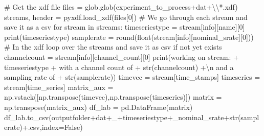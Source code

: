 \documentclass[
  letterpaper,
  DIV=11,
  numbers=noendperiod]{scrreprt}
\newenvironment{Shaded}{\begin{snugshade}}{\end{snugshade}}
\newcommand{\BuiltInTok}[1]{\textcolor[rgb]{0.00,0.23,0.31}{#1}}
\newcommand{\CharTok}[1]{\textcolor[rgb]{0.13,0.47,0.30}{#1}}
\newcommand{\CommentTok}[1]{\textcolor[rgb]{0.37,0.37,0.37}{#1}}
\newcommand{\ControlFlowTok}[1]{\textcolor[rgb]{0.00,0.23,0.31}{#1}}
\newcommand{\DecValTok}[1]{\textcolor[rgb]{0.68,0.00,0.00}{#1}}
\newcommand{\KeywordTok}[1]{\textcolor[rgb]{0.00,0.23,0.31}{#1}}
\newcommand{\NormalTok}[1]{\textcolor[rgb]{0.00,0.23,0.31}{#1}}
\newcommand{\OperatorTok}[1]{\textcolor[rgb]{0.37,0.37,0.37}{#1}}
\newcommand{\StringTok}[1]{\textcolor[rgb]{0.13,0.47,0.30}{#1}}
\newcommand{\VariableTok}[1]{\textcolor[rgb]{0.07,0.07,0.07}{#1}}
\begin{document}
\begin{Shaded}
\begin{Highlighting}[]
    \CommentTok{\# Get the xdf file}
\NormalTok{    files }\OperatorTok{=}\NormalTok{ glob.glob(experiment\_to\_process}\OperatorTok{+}\NormalTok{dat}\OperatorTok{+}\StringTok{\textquotesingle{}}\CharTok{\textbackslash{}\textbackslash{}}\StringTok{*.xdf\textquotesingle{}}\NormalTok{)}
\NormalTok{    streams, header }\OperatorTok{=}\NormalTok{ pyxdf.load\_xdf(files[}\DecValTok{0}\NormalTok{])   }
    \CommentTok{\# We go through each stream and save it as a csv}
    \ControlFlowTok{for}\NormalTok{ stream }\KeywordTok{in}\NormalTok{ streams:}
\NormalTok{        timeseriestype }\OperatorTok{=}\NormalTok{ stream[}\StringTok{\textquotesingle{}info\textquotesingle{}}\NormalTok{][}\StringTok{\textquotesingle{}name\textquotesingle{}}\NormalTok{][}\DecValTok{0}\NormalTok{]}
        \BuiltInTok{print}\NormalTok{(timeseriestype)}
\NormalTok{        samplerate }\OperatorTok{=} \BuiltInTok{round}\NormalTok{(}\BuiltInTok{float}\NormalTok{(stream[}\StringTok{\textquotesingle{}info\textquotesingle{}}\NormalTok{][}\StringTok{\textquotesingle{}nominal\_srate\textquotesingle{}}\NormalTok{][}\DecValTok{0}\NormalTok{]))}
        \CommentTok{\# In the xdf loop over the streams and save it as csv if not yet exists}
\NormalTok{        channelcount }\OperatorTok{=}\NormalTok{ stream[}\StringTok{\textquotesingle{}info\textquotesingle{}}\NormalTok{][}\StringTok{\textquotesingle{}channel\_count\textquotesingle{}}\NormalTok{][}\DecValTok{0}\NormalTok{]}
        \BuiltInTok{print}\NormalTok{(}\StringTok{\textquotesingle{}working on stream: \textquotesingle{}} \OperatorTok{+}\NormalTok{ timeseriestype }\OperatorTok{+} \StringTok{\textquotesingle{}  with a channel count of \textquotesingle{}} \OperatorTok{+} \BuiltInTok{str}\NormalTok{(channelcount) }\OperatorTok{+}\StringTok{\textquotesingle{}}\CharTok{\textbackslash{}n}\StringTok{ and a sampling rate of \textquotesingle{}} \OperatorTok{+} \BuiltInTok{str}\NormalTok{(samplerate))}
\NormalTok{        timevec }\OperatorTok{=}\NormalTok{ stream[}\StringTok{\textquotesingle{}time\_stamps\textquotesingle{}}\NormalTok{]}
\NormalTok{        timeseries }\OperatorTok{=}\NormalTok{ stream[}\StringTok{\textquotesingle{}time\_series\textquotesingle{}}\NormalTok{]}
\NormalTok{        matrix\_aux }\OperatorTok{=}\NormalTok{ np.vstack([np.transpose(timevec),np.transpose(timeseries)])}
\NormalTok{        matrix }\OperatorTok{=}\NormalTok{ np.transpose(matrix\_aux)}
\NormalTok{        df\_lab }\OperatorTok{=}\NormalTok{ pd.DataFrame(matrix)}
\NormalTok{        df\_lab.to\_csv(outputfolder}\OperatorTok{+}\NormalTok{dat}\OperatorTok{+}\StringTok{\textquotesingle{}\_\textquotesingle{}}\OperatorTok{+}\NormalTok{timeseriestype}\OperatorTok{+}\StringTok{\textquotesingle{}\_nominal\_srate\textquotesingle{}}\OperatorTok{+}\BuiltInTok{str}\NormalTok{(samplerate)}\OperatorTok{+}\StringTok{\textquotesingle{}.csv\textquotesingle{}}\NormalTok{,index}\OperatorTok{=}\VariableTok{False}\NormalTok{)}

\end{Highlighting}
\end{Shaded}
\end{document}
